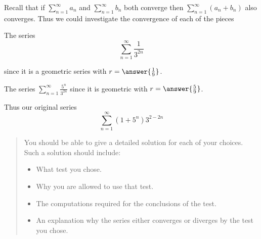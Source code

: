 \documentclass{ximera}
\begin{document}
\begin{exercise}
\begin{hint}
\begin{question}
Recall that if $\sum^{\infty}_{n=1} a_n$ and $\sum^{\infty}_{n=1} b_n$ both converge then $\sum^{\infty}_{n=1} \left( a_n+b_n \right)$ also converges. Thus we could investigate the convergence of each of the pieces

The series
\[
\sum^{\infty}_{n=1} \frac{1}{3^{2n}}
\]

 since it is a geometric series with $r=\answer{ \frac{1}{9}}$. 

The series $\sum^{\infty}_{n=1} \frac{5^n}{3^{2n}}$   
since it is geometric with $r=\answer{\frac{5}{9}}$. 

Thus our original series
\[
\sum_{n=1}^{\infty}(1+5^n)3^{2-2n}
\]

\begin{multipleChoice}
\end{multipleChoice}

\end{question}
\end{hint}







\begin{quote}
You should be able to give a detailed solution for each of your choices.  Such a solution should include:

\begin{itemize}
\item What test you chose.
\item Why you are allowed to use that test.
\item The computations required for the conclusions of the test.
\item An explanation why the series either converges or diverges by the test you chose.
\end{itemize}

\end{quote}


\end{exercise}
\end{document}
